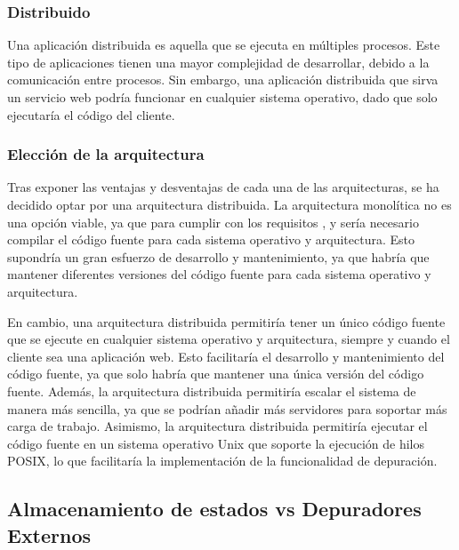 \subsubsection{Distribuido} \label{subsubsec:distribuido}

Una \gls{aplicación distribuida} \cite{DistributedSystems} es aquella que se ejecuta en múltiples \glspl{proceso}. Este tipo de aplicaciones tienen una mayor complejidad de desarrollar, debido a la comunicación entre \glspl{proceso}. Sin embargo, una \gls{aplicación distribuida} que sirva un \gls{servicio web} podría funcionar en cualquier sistema operativo, dado que solo ejecutaría el código del cliente.

\subsubsection{Elección de la arquitectura} \label{subsec:eleccion-arquitectura}

Tras exponer las ventajas y desventajas de cada una de las arquitecturas, se ha decidido optar por una arquitectura distribuida. La arquitectura monolítica no es una opción viable, ya que para cumplir con los requisitos ,  y  sería necesario compilar el \gls{código fuente} para cada sistema operativo y arquitectura. Esto supondría un gran esfuerzo de desarrollo y mantenimiento, ya que habría que mantener diferentes versiones del \gls{código fuente} para cada sistema operativo y arquitectura.

En cambio, una arquitectura distribuida permitiría tener un único \gls{código fuente} que se ejecute en cualquier sistema operativo y arquitectura, siempre y cuando el cliente sea una \gls{aplicación web}. Esto facilitaría el desarrollo y mantenimiento del \gls{código fuente}, ya que solo habría que mantener una única versión del \gls{código fuente}. Además, la arquitectura distribuida permitiría escalar el sistema de manera más sencilla, ya que se podrían añadir más servidores para soportar más carga de trabajo.
Asimismo, la arquitectura distribuida permitiría ejecutar el \gls{código fuente} en un sistema operativo \gls{Unix} que soporte la ejecución de \glspl{hilo} POSIX, lo que facilitaría la implementación de la funcionalidad de depuración.

\subsection{Almacenamiento de estados vs Depuradores Externos} \label{subsec:depuracion}

